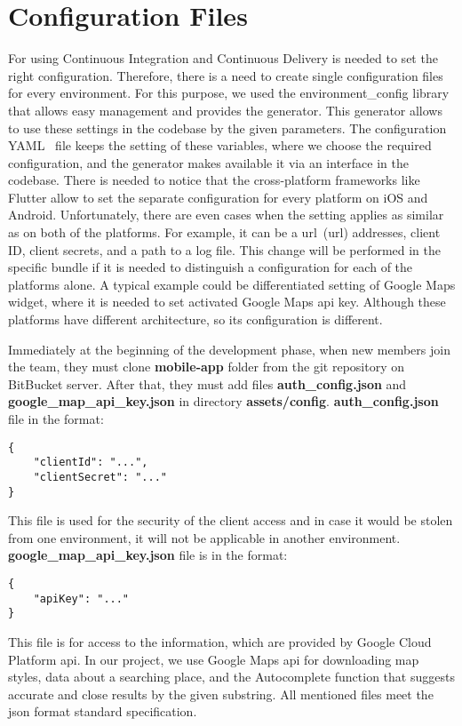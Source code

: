 \newpage
\section{Configuration Files}\label{sec:configuration-files}

For using Continuous Integration and Continuous Delivery is needed to set the right configuration.
Therefore, there is a need to create single configuration files for every environment.
For this purpose, we used the environment\_config library that allows easy management and provides the generator.
This generator allows to use these settings in the codebase by the given parameters.
The configuration YAML~\cite{yaml} file keeps the setting of these variables, where we choose the required configuration, and the generator makes available it via an interface in the codebase.
There is needed to notice that the cross-platform frameworks like Flutter allow to set the separate configuration for every platform on iOS and Android.
Unfortunately, there are even cases when the setting applies as similar as on both of the platforms.
For example, it can be a \acrshort{url}~(\acrlong{url}) addresses, client ID, client secrets, and a path to a log file.
This change will be performed in the specific bundle if it is needed to distinguish a configuration for each of the platforms alone.
A typical example could be differentiated setting of Google Maps widget, where it is needed to set activated Google Maps \acrshort{api} key.
Although these platforms have different architecture, so its configuration is different.

Immediately at the beginning of the development phase, when new members join the team, they must clone \textbf{mobile-app} folder from the git repository on BitBucket server.
After that, they must add files \textbf{auth\_config.json} and \textbf{google\_map\_api\_key.json} in directory \textbf{assets/config}.
\newline
\newline
\textbf{auth\_config.json} file in the format:
\begin{verbatim}
{
    "clientId": "...",
    "clientSecret": "..."
}
\end{verbatim}
This file is used for the security of the client access and in case it would be stolen from one environment, it will not be applicable in another environment.
\newline
\newline
\textbf{google\_map\_api\_key.json} file is in the format:
\begin{verbatim}
{
    "apiKey": "..."
}
\end{verbatim}
This file is for access to the information, which are provided by Google Cloud Platform \acrshort{api}.
In our project, we use Google Maps \acrshort{api} for downloading map styles, data about a searching place, and the Autocomplete function that suggests accurate and close results by the given substring.
All mentioned files meet the \acrshort{json} format standard specification.


